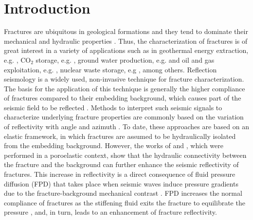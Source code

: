 \documentclass[draft]{agujournal2019}
\begin{document}
\section{Introduction}
Fractures are ubiquitous in geological formations and they tend to dominate their mechanical and hydraulic properties \cite{Liu2005,Jaeger2009}. Thus, the characterization of fractures is of great interest in a variety of  applications such as in geothermal energy extraction, e.g.  \cite{Vidal2018}, CO$_2$ storage, e.g. \cite{Ogata2014}, ground water production, e.g. \cite{Ofterdinger2019} and oil and gas exploitation, e.g. \cite{gale2010natural}, nuclear waste storage, e.g \cite{Braester1999}, among others. Reflection seismology is a widely used, non-invasive technique for fracture characterization. The basis for the application of this technique is generally the higher  compliance of fractures  compared to their embedding background, which causes part of the seismic field to be reflected \cite{Pyrak-Nolte1990, gu1996incidence}. Methods to interpret such seismic signals to characterize underlying fracture properties are commonly based on the variation of reflectivity with angle and azimuth \cite{Ruger1998, bakulin2000estimation, Minato2016,Fang2017}. To date, these approaches are based on an elastic framework, in which fractures are assumed to be hydraulically isolated from the embedding background. However, the works of  and ,  which were performed in a poroelastic context, show that the hydraulic connectivity between the fracture and the background  can further enhance the seismic reflectivity of
fractures. This increase in reflectivity is a direct consequence of fluid pressure diffusion (FPD)  that takes place when seismic waves induce pressure gradients due to the fracture-background mechanical contrast \cite{White1975, Muller2010}. FPD increases the normal compliance of fractures as the stiffening fluid exits the fracture to equilibrate the pressure \cite{Rubino2015a, Barbosa2017}, and, in turn, leads to an enhancement of fracture reflectivity. 
\end{document}
